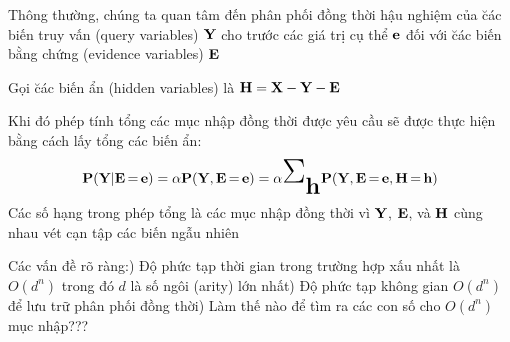 \documentclass[fleqn]{article}
\begin{document}
\begin{huge}

Thông thường, chúng ta quan tâm đến \al
  phân phối đồng thời hậu nghiệm của \u{các biến truy vấn (query variables)} $\mbox{{\bf Y}}$\al
  cho trước các giá trị cụ thể $\mbox{{\bf e}}$ đối với \u{các biến bằng chứng (evidence variables)} $\mbox{{\bf E}}$

Gọi \u{các biến ẩn (hidden variables)} là $\mbox{{\bf H}} = \mbox{{\bf X}} - \mbox{{\bf Y}} - \mbox{{\bf E}}$

Khi đó phép tính tổng các mục nhập đồng thời được yêu cầu sẽ được thực hiện bằng cách lấy tổng
các biến ẩn:
\[
\pv(\mbf{Y}|\mbf{E}\eq \mbf{e}) = \alpha \pv(\mbf{Y},\mbf{E}\eq \mbf{e})
= \alpha \mysum_{\smbf{h}} \pv(\mbf{Y},\mbf{E}\eq \mbf{e},\mbf{H}\eq \mbf{h})
\]
Các số hạng trong phép tổng là các mục nhập đồng thời vì $\mbox{{\bf Y}}$, $\mbox{{\bf E}}$, và $\mbox{{\bf H}}$ cùng nhau vét cạn tập các biến ngẫu nhiên

Các vấn đề rõ ràng:) Độ phức tạp thời gian trong trường hợp xấu nhất là $O(d^n)$ trong đó $d$ là số ngôi (arity) lớn nhất) Độ phức tạp không gian $O(d^n)$ để lưu trữ phân phối đồng thời) Làm thế nào để tìm ra các con số cho $O(d^n)$ mục nhập???

\end{huge} 
\end{document}
